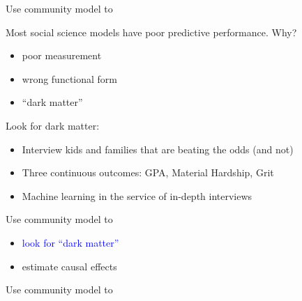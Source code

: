 \documentclass{beamer}
\begin{document}
\begin{frame}

Use community model to

\end{frame}
\begin{frame}

Most social science models have poor predictive performance.  Why?

\pause
\begin{itemize}
\item poor measurement
\pause
\item wrong functional form
\pause
\item ``dark matter''
\end{itemize}

\end{frame}
\begin{frame}

Look for dark matter:
\begin{itemize}
\item Interview kids and families that are beating the odds (and not)
\pause
\item Three continuous outcomes: GPA, Material Hardship, Grit
\pause
\item Machine learning in the service of in-depth interviews
\end{itemize}

\end{frame}
\begin{frame}

Use community model to
\begin{itemize}
\item \textcolor{blue}{look for ``dark matter''}
\item estimate causal effects
\end{itemize}

\end{frame}
\begin{frame}

Use community model to

\end{frame}
\end{document}
